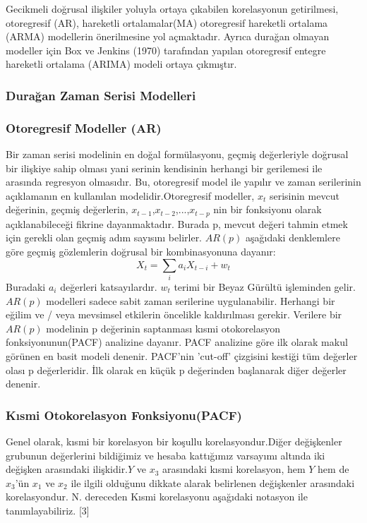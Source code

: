 \documentclass[11pt]{article}
\begin{document}
Gecikmeli doğrusal ilişkiler yoluyla ortaya çıkabilen korelasyonun
getirilmesi, otoregresif (AR), hareketli ortalamalar(MA) otoregresif
hareketli ortalama (ARMA) modellerin önerilmesine yol açmaktadır. Ayrıca
durağan olmayan modeller için Box ve Jenkins (1970) tarafından yapılan
otoregresif entegre hareketli ortalama (ARIMA) modeli ortaya çıkmıştır.

\subsubsection{Durağan Zaman Serisi
Modelleri}\label{duraux11fan-zaman-serisi-modelleri}

\subsubsection{Otoregresif Modeller (AR)}\label{otoregresif-modeller-ar}

Bir zaman serisi modelinin en doğal formülasyonu, geçmiş değerleriyle
doğrusal bir ilişkiye sahip olması yani serinin kendisinin herhangi bir
gerilemesi ile arasında regresyon olmasıdır. Bu, otoregresif model ile
yapılır ve zaman serilerinin açıklamanın en kullanılan
modelidir.Otoregresif modeller, \(x_t\) serisinin mevcut değerinin,
geçmiş değerlerin, \(x_{t-1}\),\(x_{t-2}\),...,\(x_{t-p}\) nin bir
fonksiyonu olarak açıklanabileceği fikrine dayanmaktadır. Burada p,
mevcut değeri tahmin etmek için gerekli olan geçmiş adım sayısını
belirler. \(AR(p)\) aşağıdaki denklemlere göre geçmiş gözlemlerin
doğrusal bir kombinasyonuna dayanır: \[X_t=\sum_i a_iX_{t-i}+w_t\]
Buradaki \(a_i\) değerleri katsayılardır. \(w_t\) terimi bir Beyaz
Gürültü işleminden gelir. \(AR(p)\) modelleri sadece sabit zaman
serilerine uygulanabilir. Herhangi bir eğilim ve / veya mevsimsel
etkilerin öncelikle kaldırılması gerekir. Verilere bir \(AR(p)\)
modelinin p değerinin saptanması kısmi otokorelasyon fonksiyonunun(PACF)
analizine dayanır. PACF analizine göre ilk olarak makul görünen en basit
modeli denenir. PACF'nin 'cut-off' çizgisini kestiği tüm değerler olası
p değerleridir. İlk olarak en küçük p değerinden başlanarak diğer
değerler denenir.

\subsubsection{Kısmi Otokorelasyon
Fonksiyonu(PACF)}\label{kux131smi-otokorelasyon-fonksiyonupacf}

Genel olarak, kısmi bir korelasyon bir koşullu korelasyondur.Diğer
değişkenler grubunun değerlerini bildiğimiz ve hesaba kattığımız
varsayımı altında iki değişken arasındaki ilişkidir.\(Y\) ve \(x_3\)
arasındaki kısmi korelasyon, hem \(Y\) hem de \(x_3\)'ün \(x_1\) ve
\(x_2\) ile ilgili olduğunu dikkate alarak belirlenen değişkenler
arasındaki korelasyondur. N. dereceden Kısmi korelasyonu aşağıdaki
notasyon ile tanımlayabiliriz. {[}3{]}
\end{document}
